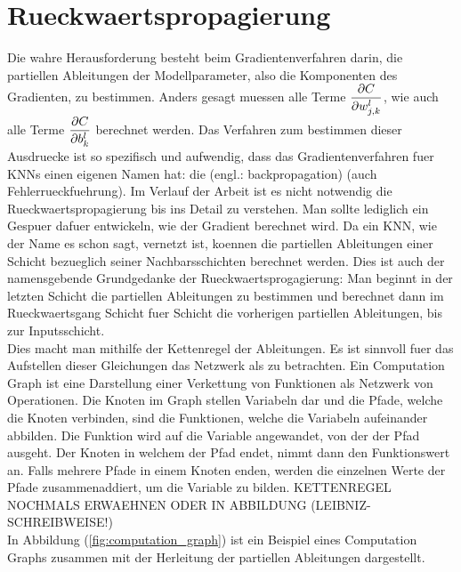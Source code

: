 \para{}
\cite{wiki:normal_distribution}
\cite{Nielsen}

\section{Rueckwaertspropagierung}\label{sec:backpropagation}
Die wahre Herausforderung besteht beim Gradientenverfahren darin,
die partiellen Ableitungen der Modellparameter,
also die Komponenten des Gradienten, zu bestimmen.
Anders gesagt muessen alle Terme
$\displaystyle\frac{\partial C}{\partial w_{j,k}^l}$, wie auch alle Terme $\displaystyle\frac{\partial C}{\partial b_k^l}$
berechnet werden.
Das Verfahren zum bestimmen dieser Ausdruecke ist so spezifisch und aufwendig,
dass das Gradientenverfahren fuer KNNs einen eigenen Namen hat: die
 (engl.: backpropagation) (auch Fehlerrueckfuehrung).
Im Verlauf der Arbeit ist es nicht notwendig die Rueckwaertspropagierung bis ins
Detail zu verstehen. Man sollte lediglich ein Gespuer dafuer entwickeln, wie
der Gradient berechnet wird.
\para{}
Da ein KNN, wie der Name es schon sagt, vernetzt ist, koennen die partiellen
Ableitungen einer Schicht bezueglich seiner Nachbarsschichten berechnet werden.
Dies ist auch der namensgebende Grundgedanke der Rueckwaertsprogagierung: Man
beginnt in der letzten Schicht die partiellen Ableitungen zu bestimmen und
berechnet dann im Rueckwaertsgang Schicht fuer Schicht die vorherigen
partiellen Ableitungen, bis zur Inputsschicht. \\
Dies macht man mithilfe der Kettenregel der Ableitungen.
Es ist sinnvoll fuer das Aufstellen dieser Gleichungen das Netzwerk als
 zu betrachten.
\para{}
Ein Computation Graph ist eine Darstellung einer Verkettung von Funktionen als Netzwerk von Operationen.
Die Knoten im Graph stellen Variabeln dar und die Pfade, welche die Knoten
verbinden, sind die Funktionen, welche die Variabeln aufeinander abbilden. Die
Funktion wird auf die Variable angewandet, von der der Pfad ausgeht. Der Knoten
in welchem der Pfad endet, nimmt dann den Funktionswert an. Falls
mehrere Pfade in einem Knoten enden, werden die einzelnen Werte der Pfade
zusammenaddiert, um die Variable zu bilden. KETTENREGEL NOCHMALS ERWAEHNEN ODER
IN ABBILDUNG (LEIBNIZ-SCHREIBWEISE!)\\
In Abbildung (\ref{fig:computation_graph}) ist ein Beispiel eines Computation
Graphs zusammen mit der Herleitung der partiellen Ableitungen dargestellt.
\para{}
